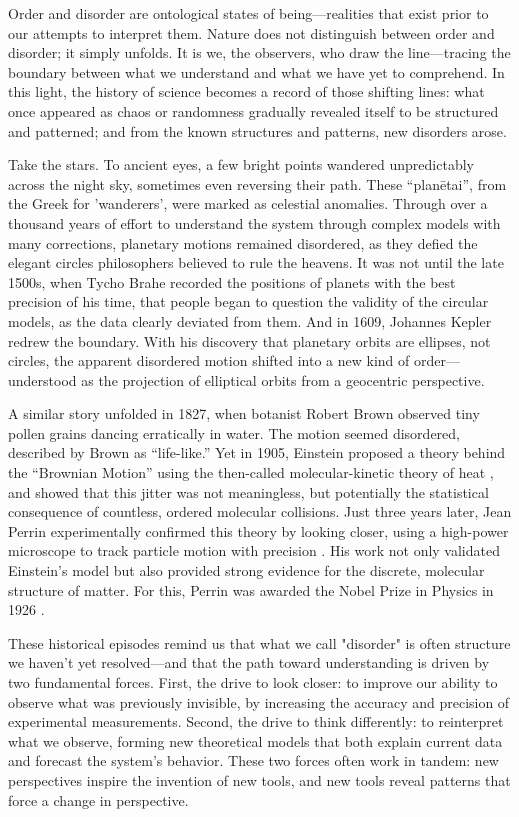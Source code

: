 Order and disorder are ontological states of being—realities that exist prior to our attempts to interpret them. Nature does not distinguish between order and disorder; it simply unfolds. It is we, the observers, who draw the line—tracing the boundary between what we understand and what we have yet to comprehend. In this light, the history of science becomes a record of those shifting lines: what once appeared as chaos or randomness gradually revealed itself to be structured and patterned; and from the known structures and patterns, new disorders arose.

Take the stars. To ancient eyes, a few bright points wandered unpredictably across the night sky, sometimes even reversing their path. These “planētai”, from the Greek for 'wanderers', were marked as celestial anomalies. Through over a thousand years of effort to understand the system through complex models with many corrections, planetary motions remained disordered, as they defied the elegant circles philosophers believed to rule the heavens. It was not until the late 1500s, when Tycho Brahe recorded the positions of planets with the best precision of his time, that people began to question the validity of the circular models, as the data clearly deviated from them. And in 1609, Johannes Kepler redrew the boundary. With his discovery that planetary orbits are ellipses, not circles, the apparent disordered motion shifted into a new kind of order—understood as the projection of elliptical orbits from a geocentric perspective.

A similar story unfolded in 1827, when botanist Robert Brown observed tiny pollen grains dancing erratically in water. The motion seemed disordered, described by Brown as “life-like.” Yet in 1905, Einstein proposed a theory behind the “Brownian Motion” using the then-called molecular-kinetic theory of heat \cite{Einstein1905}, and showed that this jitter was not meaningless, but potentially the statistical consequence of countless, ordered molecular collisions. Just three years later, Jean Perrin experimentally confirmed this theory by looking closer, using a high-power microscope to track particle motion with precision \cite{r.BrownianMovementMolecular1911}. His work not only validated Einstein’s model but also provided strong evidence for the discrete, molecular structure of matter. For this, Perrin was awarded the Nobel Prize in Physics in 1926 \cite{ https://www.nobelprize.org/prizes/physics/1926/perrin/lecture/}.

These historical episodes remind us that what we call "disorder" is often structure we haven't yet resolved—and that the path toward understanding is driven by two fundamental forces. First, the drive to look closer: to improve our ability to observe what was previously invisible, by increasing the accuracy and precision of experimental measurements. Second, the drive to think differently: to reinterpret what we observe, forming new theoretical models that both explain current data and forecast the system’s behavior. These two forces often work in tandem: new perspectives inspire the invention of new tools, and new tools reveal patterns that force a change in perspective.

